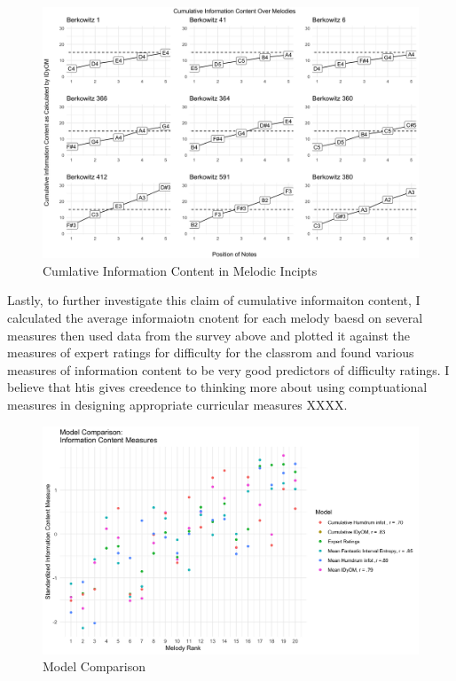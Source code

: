 \documentclass[]{book}
\begin{document}
\begin{figure}

{\centering \includegraphics[width=1\linewidth]{img/cum_grid_plot} 

}

\caption{Cumlative Information Content in Melodic Incipts}\label{fig:cumplot}
\end{figure}

Lastly, to further investigate this claim of cumulative informaiton content, I calculated the average informaiotn cnotent for each melody baesd on several measures then used data from the survey above and plotted it against the measures of expert ratings for difficulty for the classrom and found various measures of information content to be very good predictors of difficulty ratings.
I believe that htis gives creedence to thinking more about using comptuational measures in designing appropriate curricular measures
XXXX.

\begin{figure}

{\centering \includegraphics[width=1\linewidth]{img/model_comparsion_gg} 

}

\caption{Model Comparison}\label{fig:modelcomparsion}
\end{figure}
\end{document}

